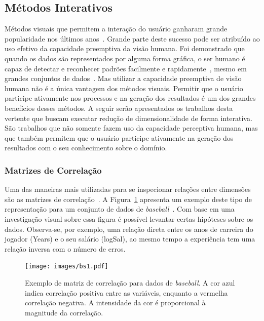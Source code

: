 \subsection{Métodos Interativos}\label{ss:int}

Métodos visuais que permitem a interação do usuário ganharam
grande popularidade nos últimos anos~\cite{State2012}.
Grande parte deste sucesso pode ser atribuído ao uso efetivo
da capacidade preemptiva da visão humana. Foi demonstrado
que quando os dados são representados por alguma forma
gráfica, o ser humano é capaz de detectar e reconhecer
padrões facilmente e rapidamente~\cite{Healey1995}, mesmo em
grandes conjuntos de dados~\cite{Fodor2002}. Mas utilizar a
capacidade preemptiva de visão humana não é a única vantagem
dos métodos visuais. Permitir que o usuário participe
ativamente nos processos e na geração dos resultados é um
dos grandes benefícios desses métodos. A seguir serão
apresentados os trabalhos desta vertente que buscam executar
redução de dimensionalidade de forma interativa. São trabalhos
que não somente fazem uso da capacidade perceptiva humana,
mas que também permitem que o usuário participe ativamente
na geração dos resultados com o seu conhecimento sobre o
domínio.

\subsubsection{Matrizes de Correlação}\label{sss:cormat}

Uma das maneiras mais utilizadas para se inspecionar
relações entre dimensões são as matrizes de
correlação~\cite{Friendly2002}. A Figura~\ref{fig:bs1}
apresenta um exemplo deste tipo de representação para um
conjunto de dados de \emph{baseball}~\cite{Friendly2002}. Com base em uma
investigação visual sobre essa figura é possível levantar
certas hipóteses sobre os dados. Observa-se, por exemplo,
uma relação direta entre os anos de carreira do jogador
(Years) e o seu salário (logSal), ao mesmo tempo a
experiência tem uma relação inversa com o número de erros.

\begin{figure}[h!]
    \centering
    \texttt{[image: images/bs1.pdf]}
    \caption[Matrizes de Correlação]
    {Exemplo de matriz de correlação para dados de
    \emph{baseball}. A cor azul indica correlação
    positiva entre as variáveis, enquanto a vermelha
    correlação negativa. A intensidade da cor é
    proporcional à magnitude da correlação.}
    \label{fig:bs1}
\end{figure}

